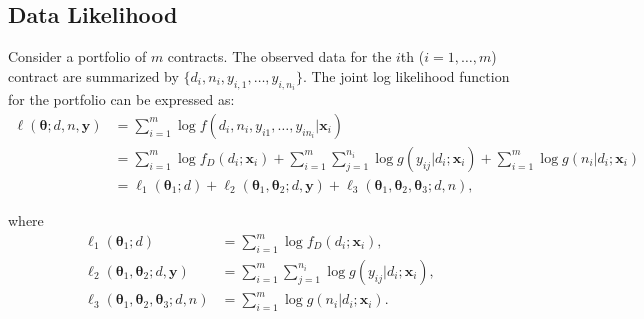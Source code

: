 \documentclass[11pt]{article}
\begin{document}
\subsection{Data Likelihood}
\label{sec:likelihood}

Consider a portfolio of $m$ contracts. The observed data for the $i$th ($i=1,\ldots,m$) contract are summarized by $\{d_i,n_i,y_{i,1},\ldots,y_{i,n_i}\}$. The joint log likelihood function for the portfolio can be expressed as:
\begin{equation} \label{eq:jointloglik}
\begin{aligned} 
\ell(\boldsymbol{\theta}; d, n, \boldsymbol{y}) &= \sum_{i=1}^m \log f(d_i,n_i,y_{i1},\ldots,y_{in_i}|\bm{x}_i) \\
	&=  \sum_{i=1}^m \log f_D(d_i;\bm{x}_i)  + \sum_{i=1}^m \sum_{j=1}^{n_i}\log  g(y_{ij}|d_i;\bm{x}_i) +  \sum_{i=1}^m \log g(n_i|d_i;\bm{x}_i)   \\
	&= \ell_1(\boldsymbol{\theta}_1;d) + \ell_2(\boldsymbol{\theta}_1, \boldsymbol{\theta}_2;d, \boldsymbol{y}) + \ell_3(\boldsymbol{\theta}_1, \boldsymbol{\theta}_2, \boldsymbol{\theta}_3;d, n), 
\end{aligned}
\end{equation}

where
\begin{align*}
\ell_1(\boldsymbol{\theta}_1;d)	&=  \sum_{i=1}^m \log f_D(d_i;\bm{x}_i),   \\
 \ell_2(\boldsymbol{\theta}_1, \boldsymbol{\theta}_2;d, \boldsymbol{y}) &= \sum_{i=1}^m \sum_{j=1}^{n_i}\log  g(y_{ij}|d_i;\bm{x}_i), \\
  \ell_3(\boldsymbol{\theta}_1, \boldsymbol{\theta}_2, \boldsymbol{\theta}_3;d, n)&= \sum_{i=1}^m \log g(n_i|d_i;\bm{x}_i).
\end{align*}
\end{document}
